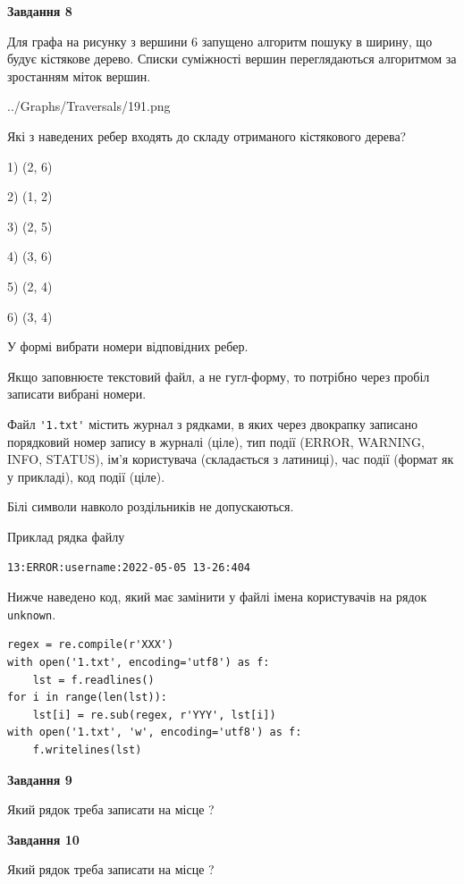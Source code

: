 \documentclass[12pt, ukrainian]{article}
\def\code#1{\Verb!#1!}
\begin{document}
{\begin {large}
{\begin {center}\textbf{Завдання 8}\end {center}}\par
Для графа на рисунку з вершини 6 запущено алгоритм пошуку в ширину, що будує кістякове дерево. Списки суміжності вершин переглядаються алгоритмом за зростанням міток вершин.\par
\begin{center}
	{../Graphs/Traversals/191.png}
\end{center}
\par Які з наведених ребер входять до складу отриманого кістякового дерева?\par
1) (2, 6)\par
2) (1, 2)\par
3) (2, 5)\par
4) (3, 6)\par
5) (2, 4)\par
6) (3, 4)\par
{\vskip 15pt} У формі вибрати номери відповідних ребер.


Якщо заповнюєте текстовий файл, а не гугл-форму, то потрібно через пробіл записа\-ти вибрані номери.\par
\newpage


Файл \code{'1.txt'} містить журнал з рядками, в яких через двокрапку записано поряд\-ко\-вий номер запису в журналі (ціле), тип події (ERROR, WARNING, INFO, STATUS), ім'я користувача (складається з латиниці), час події (фор\-мат як у прикладі), код події (ціле).

Білі символи навколо роздільників не допускаються.

Приклад рядка файлу



\begin{verbatim}
13:ERROR:username:2022-05-05 13-26:404
\end{verbatim}


Нижче наведено код, який має замінити у файлі імена користувачів на рядок \code{unknown}.



\begin{verbatim}
regex = re.compile(r'XXX')
with open('1.txt', encoding='utf8') as f:
    lst = f.readlines()
for i in range(len(lst)):
    lst[i] = re.sub(regex, r'YYY', lst[i])
with open('1.txt', 'w', encoding='utf8') as f:
    f.writelines(lst)
\end{verbatim}




{\begin {center}\textbf{Завдання 9}\end {center}}\par
Який рядок треба записати на місце  ?\par
\vspace{5mm}


{\begin {center}\textbf{Завдання 10}\end {center}}\par
Який рядок треба записати на місце  ?\par


\newpage


\end {large}}
\end{document}

